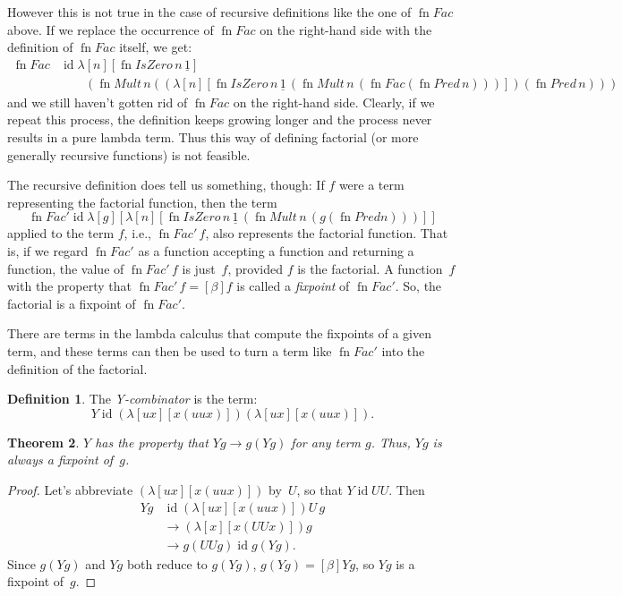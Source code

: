 \documentclass[10pt,a4paper]{article}
\theoremstyle{plain}
\newtheorem{thm}{Theorem}[section]
\theoremstyle{definition}
\newtheorem{defn}[thm]{Definition}
\theoremstyle{remark}
\newcommand*{\ollabel}[1]{\label{#1}}
\providecommand{\num}[1]{\underline{#1}}
\providecommand{\lambd}{\ensuremath{\lambda}}
\providecommand{\ident}{\operatorname{id}}
\providecommand{\red}{\mathrel{\rightarrow}}
\providecommand{\fn}{\operatorname{fn}}
\providecommand{\red}{\mathrel{\rightarrow}}
\providecommand{\fn}{\operatorname{fn}}
\begin{document}
However this is not true in the case of recursive definitions like the
one of $\fn{Fac}$ above. If we replace the occurrence of $\fn{Fac}$ on
the right-hand side with the definition of $\fn{Fac}$ itself, we get:
\begin{align*}
  \fn{Fac} & \ident \lambd[n][\fn{IsZero}\, n\, \num{1}] \\
    & \qquad (\fn{Mult}\, n
  ((\lambd[n][\fn{IsZero} \, n \, \num 1\, (\fn{Mult}\, n\, (\fn{Fac}
    (\fn{Pred}\, n)))]) (\fn{Pred}\, n)))
\end{align*}
and we still haven't gotten rid of $\fn{Fac}$ on the right-hand
side. Clearly, if we repeat this process, the definition keeps growing
longer and the process never results in a pure lambda term. Thus this
way of defining factorial (or more generally recursive functions)
is not feasible.

The recursive definition does tell us something, though: If $f$ were a
term representing the factorial function, then the term
\[
\fn{Fac}' \ident \lambd[g][\lambd[n][\fn{IsZero} \, n \, \num 1\, (\fn{Mult} \, n\, (g (\fn{Pred} n)))]]
\]
applied to the term $f$, i.e., $\fn{Fac}'\,f$, also represents the
factorial function.  That is, if we regard $\fn{Fac}'$ as a function
accepting a function and returning a function, the value of
$\fn{Fac'}\, f$ is just~$f$, provided $f$ is the factorial. A
function~$f$ with the property that $\fn{Fac}' \, f \equal[\beta] f$ is called
a \emph{fixpoint} of $\fn{Fac}'$. So, the factorial is a fixpoint of
$\fn{Fac}'$.

There are terms in the lambda calculus that compute the fixpoints of a
given term, and these terms can then be used to turn a term like
$\fn{Fac}'$ into the definition of the factorial. 

\begin{defn}
  \ollabel{defn:Turing-Y}
  The \emph{Y-combinator} is the term:
  \[
  Y \ident (\lambd[ux][x(uux)])(\lambd[ux][x(uux)]).
  \]
\end{defn}

\begin{thm}
  $Y$ has the property that $Yg \red g(Yg)$ for any term $g$. Thus,
  $Yg$ is always a fixpoint of~$g$.
\end{thm}

\begin{proof}
  Let's abbreviate $(\lambd[ux][x(uux)])$ by~$U$, so that $Y \ident UU$. Then
  \begin{align*}
    Y g &\ident (\lambd[ux][x(uux)])U\,g \\
    &\red (\lambd[x][x(UUx)])g\\
    & \red g(UUg) \ident g(Yg).
  \end{align*}
  Since $g(Yg)$ and $Yg$ both reduce to $g(Yg)$, $g(Yg) \equal[\beta]
  Yg$, so $Yg$ is a fixpoint of~$g$.
\end{proof}
\end{document}
